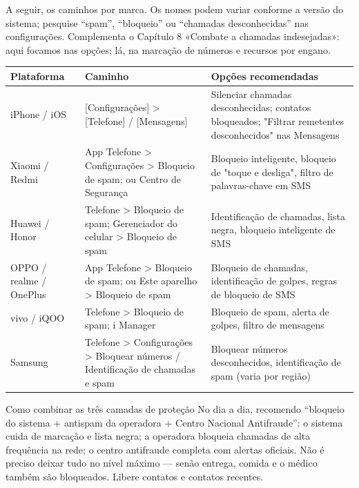 
A seguir, os caminhos por marca. Os nomes podem variar conforme a versão do sistema; pesquise “spam”, “bloqueio” ou “chamadas desconhecidas” nas configurações. Complementa o Capítulo 8 «Combate a chamadas indesejadas»: aqui focamos nas opções; lá, na marcação de números e recursos por engano.

\begin{center}
\begin{tabularx}{\linewidth}{|X|X|X|}
\hline
\textbf{Plataforma} & \textbf{Caminho} & \textbf{Opções recomendadas} \tabularnewline
\hline
iPhone / iOS & {}[Configurações] > [Telefone] / [Mensagens] & Silenciar chamadas desconhecidas; contatos bloqueados; "Filtrar remetentes desconhecidos" nas Mensagens \tabularnewline
Xiaomi / Redmi & App Telefone > Configurações > Bloqueio de spam; ou Centro de Segurança & Bloqueio inteligente, bloqueio de "toque e desliga", filtro de palavras-chave em SMS \tabularnewline
Huawei / Honor & Telefone > Bloqueio de spam; Gerenciador do celular > Bloqueio de spam & Identificação de chamadas, lista negra, bloqueio inteligente de SMS \tabularnewline
OPPO / realme / OnePlus & App Telefone > Bloqueio de spam; ou Este aparelho > Bloqueio de spam & Bloqueio de chamadas, identificação de golpes, regras de bloqueio de SMS \tabularnewline
vivo / iQOO & Telefone > Bloqueio de spam; i Manager & Bloqueio de spam, alerta de golpes, filtro de mensagens \tabularnewline
Samsung & Telefone > Configurações > Bloquear números / Identificação de chamadas e spam & Bloquear números desconhecidos, identificação de spam (varia por região) \tabularnewline
\hline
\end{tabularx}
\end{center}

\begin{tcbinfo}{Como combinar as três camadas de proteção}
No dia a dia, recomendo “bloqueio do sistema + antispam da operadora + Centro Nacional Antifraude”: o sistema cuida de marcação e lista negra; a operadora bloqueia chamadas de alta frequência na rede; o centro antifraude completa com alertas oficiais. Não é preciso deixar tudo no nível máximo — senão entrega, comida e o médico também são bloqueados. Libere contatos e contatos recentes.

\end{tcbinfo}

